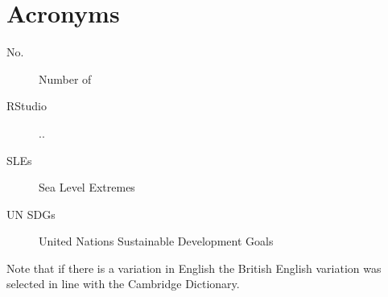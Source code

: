
\chapter{Acronyms}
\begin{description}
\item[No.] Number of
\item [RStudio] ..
\item[SLEs] Sea Level Extremes
\item [UN SDGs] United Nations Sustainable Development Goals 
\end{description}

Note that if there is a variation in English the British English variation was selected in line with the Cambridge Dictionary. 